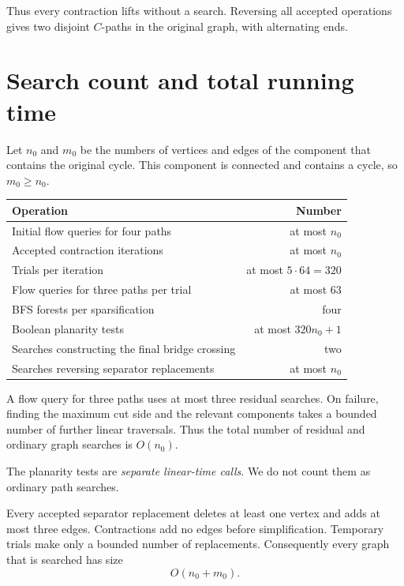 \documentclass[11pt]{article}
\begin{document}
Thus every contraction lifts without a search. Reversing all accepted
operations gives two disjoint $C$-paths in the original graph, with
alternating ends.

\section{Search count and total running time}\label{sec:time}

Let $n_0$ and $m_0$ be the numbers of vertices and edges of the component that
contains the original cycle. This component is connected and contains a
cycle, so $m_0\ge n_0$.

\begin{center}
\begin{tabular}{lr}
\toprule
Operation & Number\\
\midrule
Initial flow queries for four paths & at most $n_0$\\
Accepted contraction iterations & at most $n_0$\\
Trials per iteration & at most $5\cdot64=320$\\
Flow queries for three paths per trial & at most $63$\\
BFS forests per sparsification & four\\
Boolean planarity tests & at most $320n_0+1$\\
Searches constructing the final bridge crossing & two\\
Searches reversing separator replacements & at most $n_0$\\
\bottomrule
\end{tabular}
\end{center}

A flow query for three paths uses at most three residual searches. On failure,
finding the maximum cut side and the relevant components takes a bounded
number of further linear traversals. Thus the total number of residual and
ordinary graph searches is $O(n_0)$.

The planarity tests are \emph{separate linear-time calls}. We do not count them
as ordinary path searches.

Every accepted separator replacement deletes at least one vertex and adds at
most three edges. Contractions add no edges before simplification. Temporary
trials make only a bounded number of replacements. Consequently every graph
that is searched has size
\begin{equation*}
O(n_0+m_0).
\end{equation*}
\end{document}
